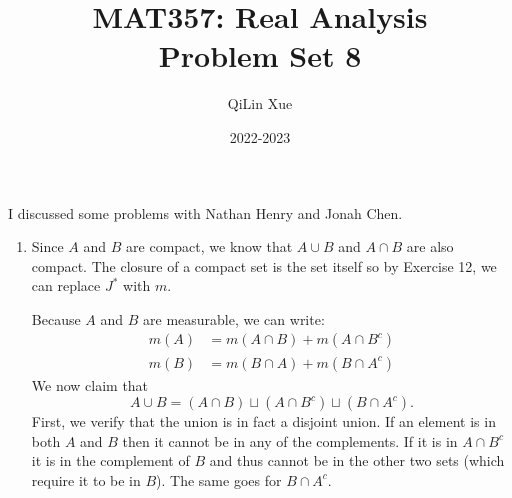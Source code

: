 \documentclass{article}
\title{\vspace{-2cm}MAT357: Real Analysis \\ Problem Set 8}
\author{QiLin Xue}
\date{2022-2023}
\begin{document}
\maketitle
I discussed some problems with Nathan Henry and Jonah Chen.
\begin{enumerate}
    \item Since $A$ and $B$ are compact, we know that $A\cup B$ and $A\cap B$ are also compact. The closure of a compact set is the set itself so by Exercise 12, we can replace $J^*$ with $m.$
    
    Because $A$ and $B$ are measurable, we can write:
    \begin{align}
        m(A) &= m(A \cap B) + m(A \cap B^c) \\ 
        m(B) &= m(B \cap A) + m(B \cap A^c)
    \end{align}
    We now claim that 
    \begin{equation}
        A\cup B = (A\cap B)\sqcup (A\cap B^c) \sqcup (B\cap A^c).
    \end{equation}
    First, we verify that the union is in fact a disjoint union. If an element is in both $A$ and $B$ then it cannot be in any of the complements. If it is in $A\cap B^c$ it is in the complement of $B$ and thus cannot be in the other two sets (which require it to be in $B$). The same goes for $B\cap A^c.$
    

\end{enumerate}
\end{document}
